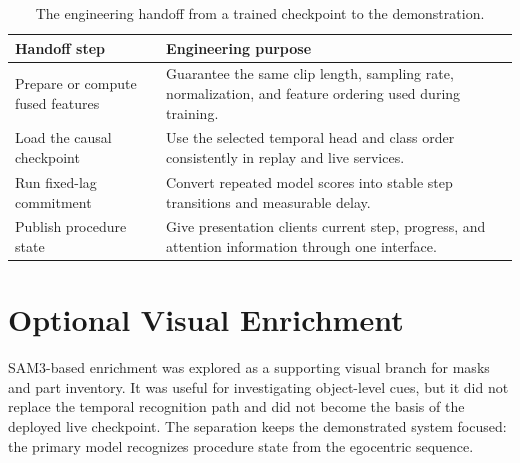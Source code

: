 \begin{table}[H]
\centering
\small
\begin{tabularx}{\textwidth}{@{}p{}X@{}}
\toprule
\textbf{Handoff step} & \textbf{Engineering purpose} \\
\midrule
Prepare or compute fused features & Guarantee the same clip length, sampling
rate, normalization, and feature ordering used during training. \\
Load the causal checkpoint & Use the selected temporal head and class order
consistently in replay and live services. \\
Run fixed-lag commitment & Convert repeated model scores into stable step
transitions and measurable delay. \\
Publish procedure state & Give presentation clients current step, progress,
and attention information through one interface. \\
\bottomrule
\end{tabularx}
\caption{The engineering handoff from a trained checkpoint to the
demonstration.}
\label{tab:checkpoint-handoff}
\end{table}

\section{Optional Visual Enrichment}

SAM3-based enrichment was explored as a supporting visual branch for masks and
part inventory. It was useful for investigating object-level cues, but it did
not replace the temporal recognition path and did not become the basis of the
deployed live checkpoint. The separation keeps the demonstrated system focused:
the primary model recognizes procedure state from the egocentric sequence.
